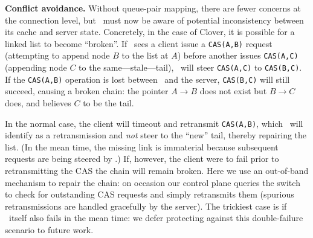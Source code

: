 \textbf{Conflict avoidance.} Without queue-pair mapping, there are
fewer concerns at the connection level, but \sword\ must now be aware
of potential inconsistency between its cache and server state.
Concretely, in the case of Clover, it is possible for a linked list to
become ``broken''.  If \sword\ sees a client issue a \texttt{CAS(A,B)}
request (attempting to append node $B$ to the list at $A$) before
another issues \texttt{CAS(A,C)} (appending node $C$ to the
same---stale---tail), \sword\ will steer \texttt{CAS(A,C)} to
\texttt{CAS(B,C)}. If the \texttt{CAS(A,B)} operation is lost between
\sword\ and the server, \texttt{CAS(B,C)} will still succeed, causing
a broken chain: the pointer $A\rightarrow B$ does not exist but
$B\rightarrow C$ does, and {\sword} believes $C$ to be the tail.

In the normal case, the client will timeout and retransmit
\texttt{CAS(A,B)}, which \sword\ will identify as a retransmission and
\emph{not} steer to the ``new'' tail, thereby repairing the list.  (In
the mean time, the missing link is immaterial because
subsequent requests are being steered by \sword.)  If, however, the client
were to fail prior to retransmitting the CAS the chain will remain broken.
Here we use an out-of-band mechanism to repair the chain: on occasion
our control plane queries the switch to check for outstanding CAS
requests and simply retransmits them (spurious retransmissions are
handled gracefully by the server).  The trickiest case is if
\sword\ itself also fails in the mean time: we defer protecting
against this double-failure scenario to future work.





